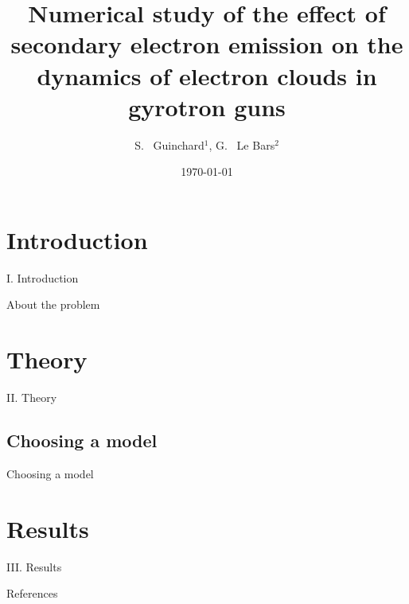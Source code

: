 \documentclass[aspectratio=169,xcolor=dvipsnames,8pt]{beamer}
\title[Summary]{Numerical study of the effect of secondary electron emission on the dynamics of electron clouds in gyrotron guns}
\author[S.Guinchard] {S. ~Guinchard$^{1}$, G. ~Le Bars$^{2}$}
\institute[SPH] %
{
    $^1$ Ecole Polytechnique Fédérale de Lausanne (EPFL), Physics Section (SPH), CH-1015 Lausanne, Switzerland\\
    $^2$ Ecole Polytechnique Fédérale de Lausanne (EPFL), Swiss Plasma Center (SPC), CH-1015 Lausanne, Switzerland\\
    \vspace{1cm}
}
\date{\today} %
\begin{document}
\begin{frame}
    \titlepage
\end{frame}

\begin{frame}
\tableofcontents
\end{frame}

\section{Introduction}
\begin{frame}{I. Introduction}

\end{frame}
\begin{frame}{About the problem}

\end{frame}


\section{Theory}
\begin{frame}{II. Theory}

\end{frame}

\subsection{Choosing a model}
\begin{frame}{Choosing a model}

\end{frame}


\section{Results}
\begin{frame}{III. Results}
\end{frame}
\begin{frame}{References}

\end{frame}
\end{document}
